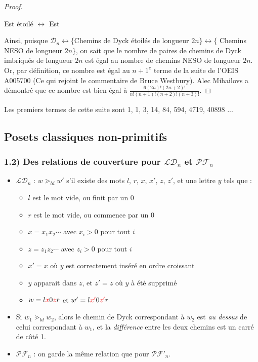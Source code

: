 \documentclass{beamer}
\begin{document}
\begin{frame}
{\begin{proof}
\begin{itemize}
                Est étoilé $\longleftrightarrow$ Est
        \end{itemize}
        Ainsi, puisque $\mathcal{D}_n \longleftrightarrow \{$Chemins de Dyck
        étoilés de longueur $2n\} \longleftrightarrow \{$ Chemins NESO de
        longueur $2n\}$, on sait que le nombre de paires de chemins de Dyck
        imbriqués de longueur $2n$ est égal au nombre de chemins NESO de
        longueur $2n$.
        Or, par définition, ce nombre est égal au $n+1^{e}$ terme de la suite
        de l'OEIS A005700 (Ce qui rejoint le commentaire de 
        Bruce Westbury).
        Alec Mihailovs a démontré que ce nombre est bien égal à 
        $\displaystyle\frac {6 (2n)! (2n+2)!}{n!(n+1)!(n+2)!(n+3)!}$.
    \end{proof}

    Les premiers termes de cette suite sont 1, 1, 3, 14, 84,
    594, 4719, 40898 ...
    }
\end{frame}

\subsection{Posets classiques non-primitifs}

\begin{frame} %
    \frametitle{1.2) Des relations de couverture pour $\mathcal{LD}_n$ et
        $\mathcal{PF}_n$}
    \begin{itemize}
        \item $\mathcal{LD}_n$ : $w \gtrdot_{ld} w'$ s'il existe des mots
            $l$, $r$, $x$, $x'$, $z$, $z'$, et une lettre $y$ tels que :
        \begin{itemize}
            \item $l$ est le mot vide, ou finit par un $0$
            \item $r$ est le mot vide, ou commence par un $0$
            \item $x = x_1x_2 \cdots$ avec $x_i > 0$ pour tout $i$
            \item $z = z_1z_2 \cdots$ avec $z_i > 0$ pour tout $i$
            \item $x' = x$ où $y$ est correctement inséré en ordre croissant
            \item $y$ apparait dans $z$, et $z' = z$ où $y$ à été supprimé
            \item $w = l\color{red}x\color{black}0\color{red}z\color{black}
                r$ et $w' = l\color{red}x'\color{black}0\color{red}z'
                \color{black}r$
        \end{itemize}
        \item  Si $w_1 \gtrdot_{ld} w_2$, alors le chemin de Dyck correspondant
        à $w_2$ est \emph{au dessus} de celui correspondant à $w_1$, et la
        \emph{différence} entre les deux chemins est un carré de côté 1.
        \item $\mathcal{PF}_n$ : on garde la même relation que pour
            $\mathcal{PF'}_n$.
    \end{itemize}
\end{frame}
\end{document}
